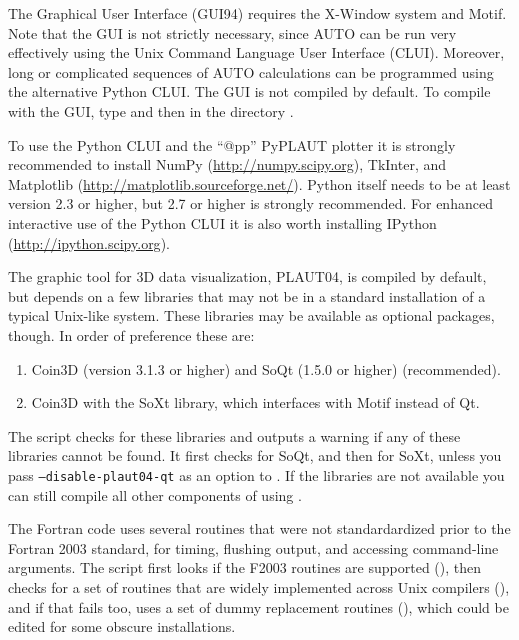 \documentclass[12pt]{report}
\begin{document}
The Graphical User Interface (GUI94) requires the {\cal X-Window} system
and {\cal Motif}.
Note that the GUI is not strictly necessary, since {\cal AUTO} can be
run very effectively using the Unix Command Language User Interface (CLUI).
Moreover, long or complicated sequences of {\cal AUTO} calculations can
be programmed using the alternative Python CLUI. 
The GUI is not compiled by default. To compile
\AUTO with the GUI, type 
and then  in the directory .

To use the Python CLUI and the ``@pp'' {\cal PyPLAUT} plotter it
is strongly recommended to install NumPy
(\url{http://numpy.scipy.org}), TkInter, and
Matplotlib (\url{http://matplotlib.sourceforge.net/}).
Python itself needs to be at least version 2.3 or higher, but 2.7 or
higher is strongly recommended.
For enhanced interactive use of the Python CLUI it is also worth
installing IPython (\url{http://ipython.scipy.org}).

The graphic tool for 3D \AUTO data visualization, {\cal PLAUT04}, is
compiled by default, but depends on a few libraries that may not be
in a standard installation of a typical Unix-like
system. These libraries may be available as optional packages,
though. In order of preference these are:
\begin{enumerate}
\item
Coin3D (version 3.1.3 or higher) and SoQt (1.5.0 or higher)
(recommended).
\item
Coin3D with the SoXt library, which interfaces with Motif
instead of Qt.
\end{enumerate}

The  script checks
for these libraries and outputs a warning if any of these libraries
cannot be found. It first checks for SoQt, and then for SoXt, unless
you pass \texttt{\hyphenchar{}\relax --disable-plaut04-qt}
as an option to .
If the libraries are not available you can still compile
all other components of \AUTO using .

The Fortran code uses several routines that were not standardardized
prior to the Fortran 2003 standard, for timing, flushing output, and
accessing command-line arguments. The  script first looks if
the F2003 routines are supported (), then checks
for a set of routines that are widely implemented across Unix
compilers (), and if that fails too, uses a set of
dummy replacement routines (), which could be
edited for some obscure installations.
\end{document}
